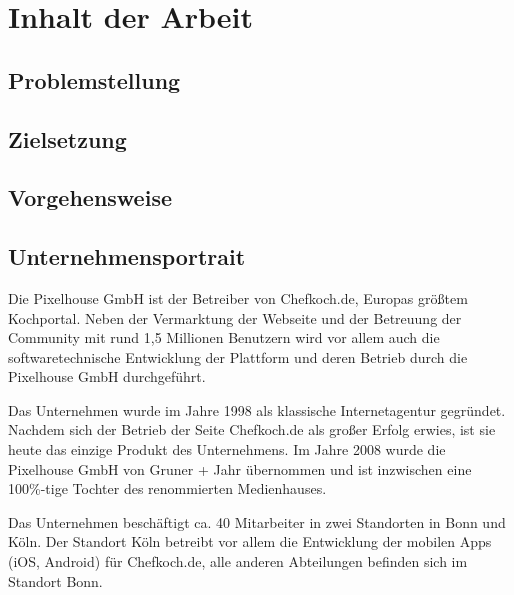 \section{Inhalt der Arbeit}

\subsection{Problemstellung}

\subsection{Zielsetzung}

\subsection{Vorgehensweise}

\subsection{Unternehmensportrait}

Die Pixelhouse GmbH ist der Betreiber von Chefkoch.de, Europas größtem Kochportal. Neben der Vermarktung der Webseite und der Betreuung der Community mit rund 1,5 Millionen Benutzern wird vor allem auch die softwaretechnische Entwicklung der Plattform und deren Betrieb durch die Pixelhouse GmbH durchgeführt.

Das Unternehmen wurde im Jahre 1998 als klassische Internetagentur gegründet. Nachdem sich der Betrieb der Seite Chefkoch.de als großer Erfolg erwies, ist sie heute das einzige Produkt des Unternehmens. Im Jahre 2008 wurde die Pixelhouse GmbH von Gruner + Jahr übernommen und ist inzwischen eine 100\%-tige Tochter des renommierten Medienhauses.

Das Unternehmen beschäftigt ca. 40 Mitarbeiter in zwei Standorten in Bonn und Köln. Der Standort Köln betreibt vor allem die Entwicklung der mobilen Apps (iOS, Android) für Chefkoch.de, alle anderen Abteilungen befinden sich im Standort Bonn.
